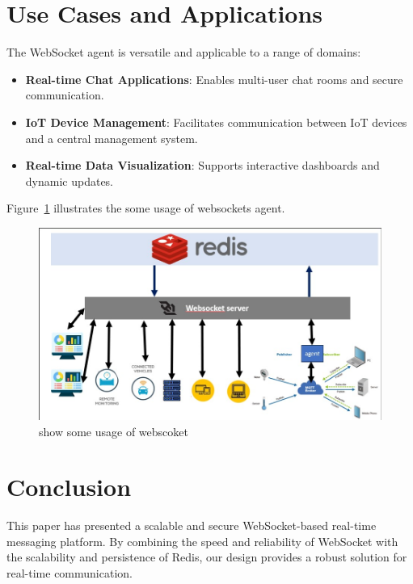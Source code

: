 \documentclass[a4paper, 11pt]{article}
\begin{document}
\section{Use Cases and Applications}
The WebSocket agent is versatile and applicable to a range of domains:

\begin{itemize}
    \item \textbf{Real-time Chat Applications}: Enables multi-user chat rooms and secure communication.
    \item \textbf{IoT Device Management}: Facilitates communication between IoT devices and a central management system.
    \item \textbf{Real-time Data Visualization}: Supports interactive dashboards and dynamic updates.
\end{itemize}
Figure~\ref{fig:usages} illustrates the some usage of websockets agent.

\begin{figure}
    \centering
    \includegraphics[width=\textwidth]{usages.jpg}
    \caption{show some usage of webscoket}
    \label{fig:usages}
\end{figure}

\section{Conclusion}
This paper has presented a scalable and secure WebSocket-based real-time messaging platform. By combining the speed and reliability of WebSocket with the scalability and persistence of Redis, our design provides a robust solution for real-time communication.
\end{document}
